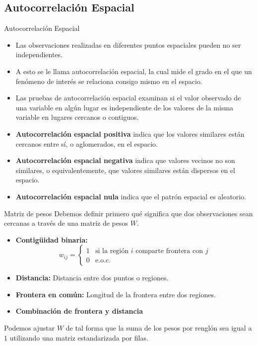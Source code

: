 \documentclass{beamer}
\begin{document}
\subsection{Autocorrelación Espacial}

\begin{frame}{Autocorrelación Espacial}
\begin{itemize}
\item Las observaciones realizadas en diferentes puntos espaciales pueden no ser independientes.
\item A esto se le llama autocorrelación espacial, la cual mide el grado en el que un fenómeno de interés se relaciona consigo mismo en el espacio.
\item Las pruebas de autocorrelación espacial examinan si el valor observado de una variable en algún lugar es independiente de los valores de la misma variable en lugares cercanos o contiguos.
\end{itemize}
\end{frame}

\begin{frame}
\begin{itemize}
\item \textbf{Autocorrelación espacial positiva} indica que los valores similares están cercanos entre sí, o aglomerados, en el espacio.
\item \textbf{Autocorrelación espacial negativa} indica que valores vecinos no son similares, o equivalentemente, que valores similares están dispersos en el espacio.
\item \textbf{Autocorrelación espacial nula} indica que el patrón espacial es aleatorio.
\end{itemize}
\end{frame}

\begin{frame}{Matriz de pesos}
  Debemos definir primero qué significa que dos observaciones sean cercanas a través de una matriz de pesos $W$.
  \begin{itemize}
  \item  \textbf{Contigüidad binaria:}
    \begin{equation} \label{binw}
      w_{ij}=  \begin{cases} 1 & \mbox{si la región } i \mbox{ comparte frontera con } j \\ 
      0 & \mbox{e.o.c.} 
      \end{cases}
    \end{equation}
  \item \textbf{Distancia:} Distancia entre dos puntos o regiones.
  \item \textbf{Frontera en común:} Longitud de la frontera entre dos regiones.
  \item \textbf{Combinación de frontera y distancia}
  \end{itemize}

  Podemos ajustar $W$ de tal forma que la suma de los pesos por renglón sea igual a $1$  utilizando una matriz estandarizada por filas.
\end{frame}
\end{document}
